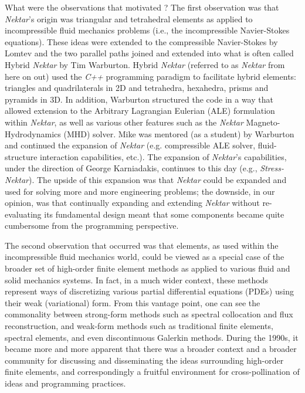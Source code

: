 What were the observations that motivated \nek{}?  The first observation was that \emph{Nektar}'s origin
was triangular and tetrahedral \shp{} elements as applied to incompressible fluid mechanics 
problems (i.e., the incompressible Navier-Stokes equations).  These ideas were extended to 
the compressible Navier-Stokes by Lomtev and the two parallel paths joined and extended into
what is often called Hybrid \emph{Nektar} by Tim Warburton. Hybrid \emph{Nektar} (referred to as \emph{Nektar} from
here on out) used the {\em C++} programming paradigm to facilitate hybrid elements:  triangles and
quadrilaterals in 2D and tetrahedra, hexahedra, prisms and pyramids in 3D.   In addition, Warburton
structured the code in a way that allowed extension to the Arbitrary Lagrangian Eulerian (ALE) formulation
within \emph{Nektar}, as well as various other features such as the \emph{Nektar} Magneto-Hydrodynamics (MHD) solver.
Mike was mentored (as a student) by Warburton and continued the expansion of \emph{Nektar} (e.g. compressible
ALE solver, fluid-structure interaction capabilities, etc.).  The expansion of \emph{Nektar}'s capabilities, under
the direction of George Karniadakis, continues to this day (e.g., \emph{Stress-Nektar}).
The upside of this expansion was that \emph{Nektar} could
be expanded and used for solving more and more engineering problems; the downside, in our opinion, 
was that continually expanding and extending
\emph{Nektar} without re-evaluating its fundamental design meant that some components became quite 
cumbersome from the programming perspective.  

The second observation that occurred was that \shp{} elements, as used within the incompressible
fluid mechanics world, could be viewed as a special case of the broader set of high-order finite element methods
as applied to various fluid and solid mechanics systems.  In fact, in a much wider context, these methods
represent ways of discretizing various partial differential equations (PDEs) using their weak (variational) form.
From this vantage point, one can see the commonality between strong-form methods such as spectral collocation
and flux reconstruction, and weak-form methods such as traditional finite elements, spectral elements, and
even discontinuous Galerkin methods.  
During the 1990s, it became more and more apparent that there was a broader context and a broader
community for discussing and disseminating the ideas surrounding high-order finite elements, and 
correspondingly a fruitful environment for cross-pollination of ideas and programming practices.

